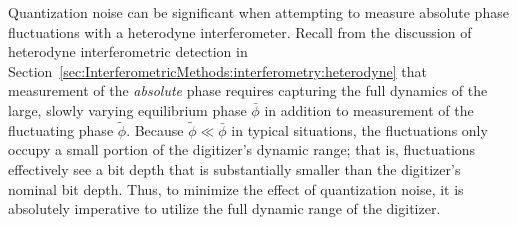 Quantization noise can be significant
when attempting to measure absolute phase fluctuations
with a heterodyne interferometer.
Recall from the discussion of heterodyne interferometric detection in
Section~\ref{sec:InterferometricMethods:interferometry:heterodyne}
that measurement of the \emph{absolute} phase
requires capturing the full dynamics
of the large, slowly varying equilibrium phase $\bar{\phi}$
in addition to measurement of the fluctuating phase $\tilde{\phi}$.
Because $\tilde{\phi} \ll \bar{\phi}$ in typical situations,
the fluctuations only occupy a small portion
of the digitizer's dynamic range; that is,
fluctuations effectively see a bit depth that
is substantially smaller than the digitizer's nominal bit depth.
Thus, to minimize the effect of quantization noise,
it is absolutely imperative
to utilize the full dynamic range of the digitizer.




